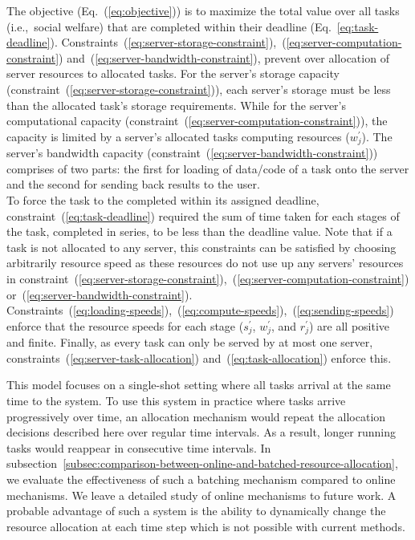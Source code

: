 The objective (Eq.~(\ref{eq:objective})) is to maximize the total value over all tasks (i.e.,\ social welfare) that
are completed within their deadline (Eq.~\ref{eq:task-deadline}).
Constraints~(\ref{eq:server-storage-constraint}),~(\ref{eq:server-computation-constraint})
and~(\ref{eq:server-bandwidth-constraint}), prevent over allocation of server resources to allocated tasks.
For the server's storage capacity (constraint~(\ref{eq:server-storage-constraint})), each server's storage must be less
than the allocated task's storage requirements. While for the server's computational capacity
(constraint~(\ref{eq:server-computation-constraint})), the capacity is limited by a server's allocated tasks
computing resources ($w^{'}_j$). The server's bandwidth capacity (constraint~(\ref{eq:server-bandwidth-constraint}))
comprises of two parts: the first for loading of data/code of a task onto the server and the second for sending
back results to the user. \\
To force the task to the completed within its assigned deadline, constraint~(\ref{eq:task-deadline}) required the sum
of time taken for each stages of the task, completed in series, to be less than the deadline value.
Note that if a task is not allocated to any server, this constraints can be satisfied by choosing arbitrarily
resource speed as these resources do not use up any servers' resources in
constraint~(\ref{eq:server-storage-constraint}),~(\ref{eq:server-computation-constraint})
or~(\ref{eq:server-bandwidth-constraint}). \\
Constraints~(\ref{eq:loading-speeds}),~(\ref{eq:compute-speeds}),~(\ref{eq:sending-speeds}) enforce that the resource
speeds for each stage ($s^{'}_j$, $w^{'}_j$, and $r^{'}_j$) are all positive and finite.
Finally, as every task can only be served by at most one server, constraints~(\ref{eq:server-task-allocation})
and~(\ref{eq:task-allocation}) enforce this.

This model focuses on a single-shot setting where all tasks arrival at the same time to the system. To use this system
in practice where tasks arrive progressively over time, an allocation mechanism would repeat the allocation decisions
described here over regular time intervals. As a result, longer running tasks would reappear in consecutive time
intervals.
In subsection~\ref{subsec:comparison-between-online-and-batched-resource-allocation}, we evaluate the effectiveness of
such a batching mechanism compared to online mechanisms. We leave a detailed study of online mechanisms to future work.
A probable advantage of such a system is the ability to dynamically change the resource allocation at each time step
which is not possible with current methods.

